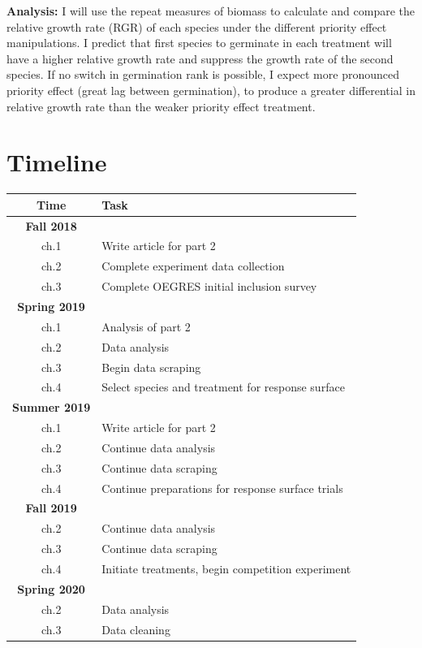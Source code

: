 \documentclass{article}\usepackage[]{graphicx}\usepackage[]{color}
\begin{document}
\indent\textbf{Analysis:} I will use the repeat measures of biomass to calculate and compare the relative growth rate (RGR) \citep{Connolly2005} of each species under the different priority effect manipulations. I predict that first species to germinate in each treatment will have a higher relative growth rate and suppress the growth rate of the second species. If no switch in germination rank is possible, I expect more pronounced priority effect (great lag between germination), to produce a greater differential in relative growth rate than the weaker priority effect treatment.\\  


\section*{Timeline}
\begin{center}
\begin{tabular}{|c|l|}
\hline
Time & Task\\
\hline
\textbf{Fall 2018}& \\
ch.1 & Write article for part 2\\
ch.2 & Complete experiment data collection\\
ch.3 & Complete OEGRES initial inclusion survey\\
\hline
\textbf{Spring 2019}& \\
ch.1 & Analysis of part 2\\
ch.2 & Data analysis\\
ch.3 & Begin data scraping\\
ch.4 & Select species and treatment for response surface \\
\hline
\textbf{Summer 2019}& \\
ch.1 & Write article for part 2\\
ch.2 & Continue data analysis\\
ch.3 & Continue data scraping\\
ch.4 & Continue preparations for response surface trials \\
\hline
\textbf{Fall 2019}& \\
ch.2 & Continue data analysis\\
ch.3 & Continue data scraping\\
ch.4 & Initiate treatments, begin competition experiment \\
\hline
\textbf{Spring 2020}& \\
ch.2 & Data analysis\\
ch.3 & Data cleaning\\

\end{tabular}
\end{center}
\end{document}

